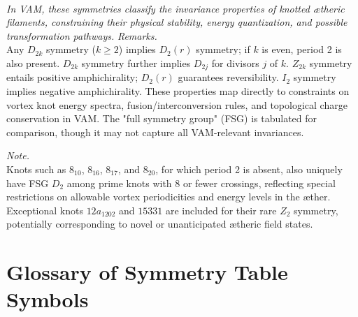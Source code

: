 \documentclass{article}
\begin{document}
\\
\textit{In VAM, these symmetries classify the invariance properties of knotted ætheric filaments, constraining their physical stability, energy quantization, and possible transformation pathways.}
\noindent
\textit{Remarks.}\\
Any $D_{2k}$ symmetry ($k\geq2$) implies $D_2(r)$ symmetry; if $k$ is even, period 2 is also present. $D_{2k}$ symmetry further implies $D_{2j}$ for divisors $j$ of $k$. $Z_{2k}$ symmetry entails positive amphichirality; $D_2(r)$ guarantees reversibility. $I_2$ symmetry implies negative amphichirality. These properties map directly to constraints on vortex knot energy spectra, fusion/interconversion rules, and topological charge conservation in VAM. The "full symmetry group" (FSG) is tabulated for comparison, though it may not capture all VAM-relevant invariances.

\vspace{1em}

\textit{Note.}\\
Knots such as $8_{10}$, $8_{16}$, $8_{17}$, and $8_{20}$, for which period 2 is absent, also uniquely have FSG $D_2$ among prime knots with 8 or fewer crossings, reflecting special restrictions on allowable vortex periodicities and energy levels in the æther. Exceptional knots $12a_{1202}$ and $15331$ are included for their rare $Z_2$ symmetry, potentially corresponding to novel or unanticipated ætheric field states.

\section{Glossary of Symmetry Table Symbols}
\end{document}
